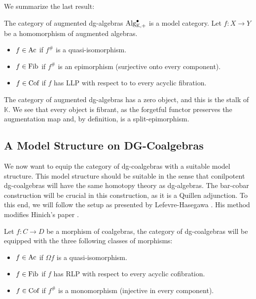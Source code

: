 \documentclass[../thesis.tex]{subfiles}
\begin{document}
            We summarize the last result:

            The category of augmented dg-algebras $\tt{Alg}^\bullet_{\mathbb{K},+}$ is a model category. Let $f: X\rightarrow Y$ be a homomorphism of augmented algebras. 
            \begin{itemize}
                \item $f\in \tt{Ac}$ if $f^\#$ is a quasi-isomorphism.
                \item $f\in \tt{Fib}$ if $f^\#$ is an epimorphism (surjective onto every component).
                \item $f\in \tt{Cof}$ if $f$ has LLP with respect to to every acyclic fibration.
            \end{itemize}
            
            The category of augmented dg-algebras has a zero object, and this is the stalk of $\mathbb{K}$. We see that every object is fibrant, as the forgetful functor preserves the augmentation map and, by definition, is a split-epimorphism.
            
    \subsection{A Model Structure on DG-Coalgebras}

            We now want to equip the category of dg-coalgebras with a suitable model structure. This model structure should be suitable in the sense that conilpotent dg-coalgebras will have the same homotopy theory as dg-algebras. The bar-cobar construction will be crucial in this construction, as it is a Quillen adjunction. To this end, we will follow the setup as presented by Lefevre-Hasegawa \cite{LefevreHasegawa03}. His method modifies Hinich's paper \cite{Hinich01}.

            Let $f: C \rightarrow D$ be a morphism of coalgebras, the category of dg-coalgebras will be equipped with the three following classes of morphisms:
            \begin{itemize}
                \item $f\in \tt{Ac}$ if $\Omega f$ is a quasi-isomorphism.
                \item $f\in \tt{Fib}$ if $f$ has RLP with respect to every acyclic cofibration.
                \item $f\in \tt{Cof}$ if $f^\#$ is a monomorphism (injective in every component).
            \end{itemize}
\end{document}
